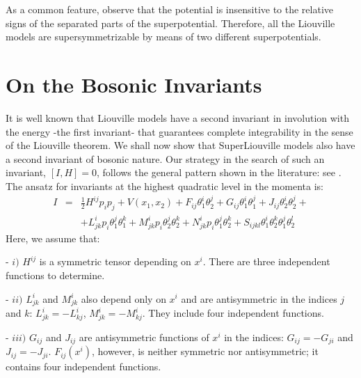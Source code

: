 \documentclass[a4paper,11pt,twoside]{article}
\begin{document}
\vspace*{0.1cm}

As a common feature, observe that the potential is insensitive to
the relative signs of the separated parts of the superpotential.
Therefore, all the Liouville models are supersymmetrizable by
means of two different superpotentials.


\section{On the Bosonic Invariants}
It is well known that Liouville models have a second invariant in
involution with the energy -the first invariant- that guarantees
complete integrability in the sense of the Liouville theorem. We
shall now show that SuperLiouville models also have a second
invariant of bosonic nature. Our strategy in the search of such an
invariant, $[I,H]=0$, follows the general pattern shown in the
literature: see \cite{H1}. The ansatz for invariants at the
highest quadratic level in the momenta is:
\[ \begin{array}{lcr}
I&=&\displaystyle{\frac{1}{2} H^{ij} p_i p_j + V(x_1,x_2)+F_{ij}
\theta_1^i \theta_2^j+G_{ij} \theta_1^i \theta_1^j+ J_{ij}
\theta_2^i \theta_2^j+} \\ & & \displaystyle{+ L^i_{jk} p_i
\theta_1^j \theta_1^k+ M^i_{jk} p_i \theta_2^j \theta_2^k+
N^i_{jk} p_i \theta_1^j \theta_2^k+ S_{ijkl} \theta_1^i \theta_2^k
\theta_1^j \theta_2^l}
\end{array}
\]
Here, we assume that:

\vspace*{0.1cm}

\noindent - $i)$ $H^{ij}$ is a symmetric tensor depending on $x^i$. There are
three independent functions to determine.

\vspace*{0.1cm}

\noindent - $ii)$ $L^i_{jk}$ and $M^i_{jk}$ also depend only on
$x^i$ and are antisymmetric in the indices $j$ and $k$:
$L^i_{jk}=-L^i_{kj}$, $M^i_{jk}=-M^i_{kj}$. They include four
independent functions.

\vspace*{0.1cm}

\noindent - $iii)$ $G_{ij}$ and $J_{ij}$ are antisymmetric
functions of $x^i$ in the indices: $G_{ij}=-G_{ji}$ and
$J_{ij}=-J_{ji}$. $F_{ij}(x^i)$, however, is neither symmetric nor
antisymmetric; it contains four independent functions.

\vspace*{0.1cm}
\end{document}
